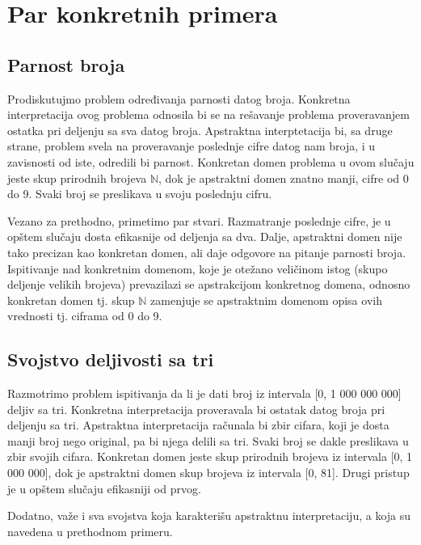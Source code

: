 \documentclass[a4paper]{article}
\newcommand*{\field}[1]{\mathbb{#1}} %
\begin{document}
\section{Par konkretnih primera}
\subsection{Parnost broja}

Prodiskutujmo problem određivanja parnosti datog broja. Konkretna interpretacija ovog problema odnosila bi se na rešavanje problema proveravanjem ostatka pri deljenju sa sva datog broja. Apstraktna interptetacija bi, sa druge strane, problem svela na proveravanje poslednje cifre datog nam broja, i u zavisnosti od iste, odredili bi parnost. Konkretan domen problema u ovom slučaju jeste skup prirodnih brojeva $\field{N}$, dok je apstraktni domen znatno manji, cifre od 0 do 9. Svaki broj se preslikava u svoju poslednju cifru. \newline

Vezano za prethodno, primetimo par stvari. Razmatranje poslednje cifre, je u opštem slučaju dosta efikasnije od deljenja sa dva. Dalje, apstraktni domen nije tako precizan kao konkretan domen, ali daje odgovore na pitanje parnosti broja. Ispitivanje nad konkretnim domenom, koje je otežano veličinom istog (skupo deljenje velikih brojeva) prevazilazi se apstrakcijom konkretnog domena, odnosno konkretan domen tj. skup $\field{N}$ zamenjuje se apstraktnim domenom opisa ovih vrednosti tj. ciframa od 0 do 9.

\subsection{Svojstvo deljivosti sa tri}

Razmotrimo problem ispitivanja da li je dati broj iz intervala [0, 1 000 000 000] deljiv sa tri. Konkretna interpretacija proveravala bi ostatak datog broja pri deljenju sa tri. Apstraktna interpretacija računala bi zbir cifara, koji je dosta manji broj nego original, pa bi njega delili sa tri. Svaki broj se dakle preslikava u zbir svojih cifara. Konkretan domen jeste skup prirodnih brojeva iz intervala [0, 1 000 000], dok je apstraktni domen skup brojeva iz intervala [0, 81]. Drugi pristup je u opštem slučaju efikasniji od prvog. \newline

Dodatno, važe i sva svojstva koja karakterišu apstraktnu interpretaciju, a koja su navedena u prethodnom primeru.
\end{document}
